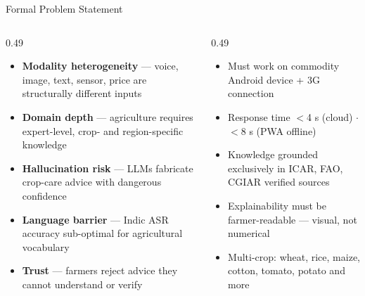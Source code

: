 \documentclass[aspectratio=169, 10pt]{beamer}
\begin{document}
\begin{frame}{Formal Problem Statement}
  \vspace{0.2em}
  \begin{columns}[T]
    \begin{column}{0.49\textwidth}
      \begin{tcolorbox}[agricard=Coral, title=Challenges to overcome, before skip=0pt, top=3pt, bottom=3pt]
        \scriptsize
        \begin{itemize}[leftmargin=1.1em, itemsep=0.5pt, topsep=0pt]
          \item \textbf{Modality heterogeneity} — voice, image, text, sensor, price are structurally different inputs
          \item \textbf{Domain depth} — agriculture requires expert-level, crop- and region-specific knowledge
          \item \textbf{Hallucination risk} — LLMs fabricate crop-care advice with dangerous confidence
          \item \textbf{Language barrier} — Indic ASR accuracy sub-optimal for agricultural vocabulary
          \item \textbf{Trust} — farmers reject advice they cannot understand or verify
        \end{itemize}
      \end{tcolorbox}
    \end{column}
    \begin{column}{0.49\textwidth}
      \begin{tcolorbox}[agricard=Green, title=Solution constraints, before skip=0pt, top=3pt, bottom=3pt]
        \scriptsize
        \begin{itemize}[leftmargin=1.1em, itemsep=0.5pt, topsep=0pt]
          \item Must work on commodity Android device + 3G connection
          \item Response time $<$4 s (cloud) $\cdot$ $<$8 s (PWA offline)
          \item Knowledge grounded exclusively in ICAR, FAO, CGIAR verified sources
          \item Explainability must be farmer-readable — visual, not numerical
          \item Multi-crop: wheat, rice, maize, cotton, tomato, potato and more
        \end{itemize}
      \end{tcolorbox}
    \end{column}
  \end{columns}
\end{frame}
\end{document}

